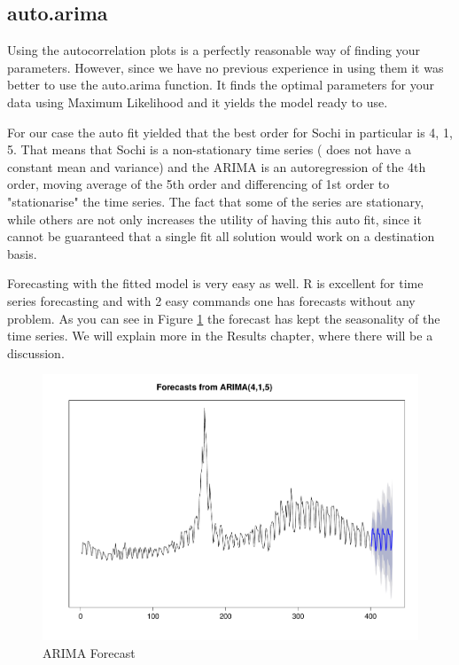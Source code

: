 \documentclass[minf,twoside,singlespacing,parskip,frontabs,notimes,12pt]{infthesis} %
\begin{document}
\subsection{auto.arima}

Using the autocorrelation plots is a perfectly reasonable way of finding your parameters. However, since we have no previous experience in using them it was better to use the auto.arima function. It finds the optimal parameters for your data using Maximum Likelihood and it yields the model ready to use. 

For our case the auto fit yielded that the best order for Sochi in particular is 4, 1, 5. That means that Sochi is a non-stationary time series ( does not have a constant mean and variance) and the ARIMA is an autoregression of the 4th order, moving average of the 5th order and differencing of 1st order to "stationarise" the time series. The fact that some of the series are stationary, while others are not only increases the utility of having this auto fit, since it cannot be guaranteed that a single fit all solution would work on a destination basis. 

Forecasting with the fitted model is very easy as well. R is excellent for time series forecasting and with 2 easy commands one has forecasts without any problem. As you can see in Figure \ref{arima-forecast} the forecast has kept the seasonality of the time series. We will explain more in the Results chapter, where there will be a discussion.

\begin{figure}[]
\begin{center}
\includegraphics[width=\textwidth]{arima_forecast}
\end{center}
\caption{ARIMA Forecast}
\label{arima-forecast}
\end{figure}
\end{document}
